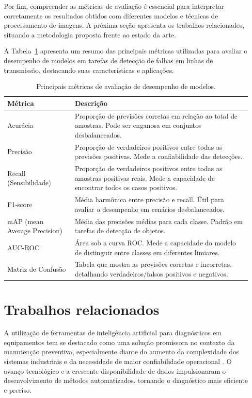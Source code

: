 Por fim, compreender as métricas de avaliação é essencial para interpretar corretamente os resultados obtidos com diferentes modelos e técnicas de processamento de imagens. A próxima seção apresenta os trabalhos relacionados, situando a metodologia proposta frente ao estado da arte.

A Tabela~\ref{tab:metricas_avaliacao_modelos} apresenta um resumo das principais métricas utilizadas para avaliar o desempenho de modelos em tarefas de detecção de falhas em linhas de transmissão, destacando suas características e aplicações.

\begin{table}[H]
\centering
\caption{Principais métricas de avaliação de desempenho de modelos.}
\label{tab:metricas_avaliacao_modelos}
\begin{tabular}{|p{4.5cm}|p{10cm}|}
\hline
\textbf{Métrica} & \textbf{Descrição} \\
\hline
Acurácia & Proporção de previsões corretas em relação ao total de amostras. Pode ser enganosa em conjuntos desbalanceados. \\
\hline
Precisão & Proporção de verdadeiros positivos entre todas as previsões positivas. Mede a confiabilidade das detecções. \\
\hline
Recall (Sensibilidade) & Proporção de verdadeiros positivos entre todas as amostras positivas reais. Mede a capacidade de encontrar todos os casos positivos. \\
\hline
F1-score & Média harmônica entre precisão e recall. Útil para avaliar o desempenho em cenários desbalanceados. \\
\hline
mAP (mean Average Precision) & Média das precisões médias para cada classe. Padrão em tarefas de detecção de objetos. \\
\hline
AUC-ROC & Área sob a curva ROC. Mede a capacidade do modelo de distinguir entre classes em diferentes limiares. \\
\hline
Matriz de Confusão & Tabela que mostra as previsões corretas e incorretas, detalhando verdadeiros/falsos positivos e negativos. \\
\hline
\end{tabular}
\end{table}

\section{Trabalhos relacionados}
\label{sec:trabalhos_relacionados}

A utilização de ferramentas de inteligência artificial para diagnósticos em equipamentos tem se destacado como uma solução promissora no contexto da manutenção preventiva, especialmente diante do aumento da complexidade dos sistemas industriais e da necessidade de maior confiabilidade operacional \cite{Salvi2021}. O avanço tecnológico e a crescente disponibilidade de dados impulsionaram o desenvolvimento de métodos automatizados, tornando o diagnóstico mais eficiente e preciso.

